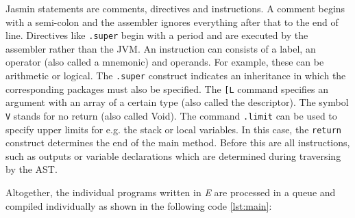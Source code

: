 Jasmin statements are comments, directives and instructions. A comment begins with a semi-colon and the assembler ignores everything after that to the end of line. Directives like \texttt{.super} begin with a period and are executed by the assembler rather than the JVM. An instruction can consists of a label, an operator (also called a mnemonic) and operands. For example, these can be arithmetic or logical. The \texttt{.super} construct indicates an inheritance in which the corresponding packages must also be specified. The \texttt{[L} command specifies an argument with an array of a certain type (also called the descriptor). The symbol \texttt{V} stands for no return (also called Void). The command \texttt{.limit} can be used to specify upper limits for e.g. the stack or local variables. In this case, the \texttt{return} construct determines the end of the main method. Before this are all instructions, such as outputs or variable declarations which are determined during traversing by the AST.

Altogether, the individual programs written in \emph{E} are processed in a queue and compiled individually as shown in the following code \ref{lst:main}:

